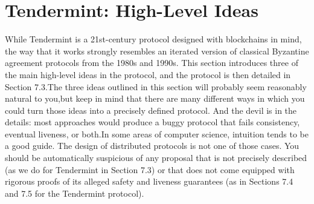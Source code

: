 \section{Tendermint: High-Level Ideas}
While Tendermint is a 21st-century protocol designed with blockchains in mind, the way that it works strongly resembles an iterated 
version of classical Byzantine agreement protocols from the 1980s and 1990s. This section introduces three of the main high-level ideas 
in the protocol, and the protocol is then detailed in Section 7.3.The three ideas outlined in this section will probably seem reasonably 
natural to you,but keep in mind that there are many different ways in which you could turn those ideas into a precisely defined protocol. 
And the devil is in the details: most approaches would produce a buggy protocol that fails consistency, eventual liveness, or both.In 
some areas of computer science, intuition tends to be a good guide. The design of distributed protocols is not one of those cases. You 
should be automatically suspicious of any proposal that is not precisely described (as we do for Tendermint in Section 7.3) or that does 
not come equipped with rigorous proofs of its alleged safety and liveness guarantees (as in Sections 7.4 and 7.5 for the Tendermint 
protocol).

